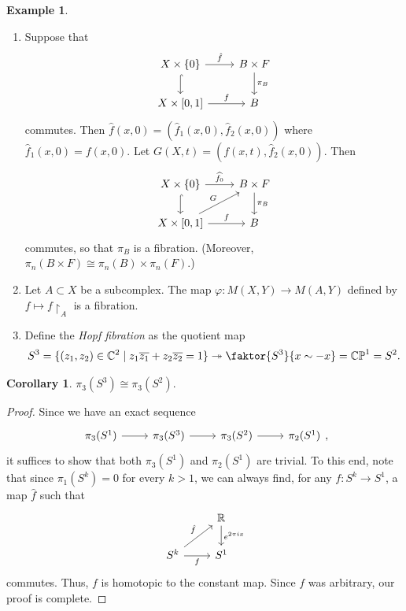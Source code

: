 \documentclass[10pt,letterpaper,cm]{nupset}
\theoremstyle{definition}
\newtheorem{exmp}[defn]{Example}
\theoremstyle{theorem}
\newtheorem{corollary}[defn]{Corollary}
\theoremstyle{remark}
\newcommand{\C}{\mathbb C}
\newcommand{\CP}{\mathbb{CP}}
\newcommand{\R}{\mathbb{R}}
\newcommand{\1}{\mathbb{1}}
\newcommand{\0}{\vec 0}
\newcommand{\be}{\begin{enumerate}}
\newcommand{\ee}{\end{enumerate}}
\begin{document}
\begin{exmp} $ $
\be
\item Suppose that
\[
\begin{tikzcd}
X\times \{0\} \arrow[d, hook] \arrow[r, "\hat{f}"] & B \times F \arrow[d, "\pi_B"] \\
{X\times [0,1]} \arrow[r, "f"]                           & B                            
\end{tikzcd}
\] commutes. Then $\hat{f}(x,0) = \left(\hat{f}_1(x,0), \hat{f}_2(x,0)\right)$ where $\hat{f}_1(x,0) = f(x,0)$. Let $G(X,t) =  (f(x,t), \hat{f}_2(x,0))$. Then \[
\begin{tikzcd}
X\times \{0\} \arrow[d, hook] \arrow[r, "\widehat{f_0}"] & B \times F \arrow[d, "\pi_B"] \\
{X\times [0,1]} \arrow[r, "f"] \arrow[ru, "G"]           & B                            
\end{tikzcd}
\] commutes, so that $\pi_B$ is a fibration. (Moreover, $\pi_n(B \times F) \cong \pi_n(B) \times \pi_n(F)$.)
\item Let $A \subset X$ be a subcomplex. The map $\varphi : M(X, Y) \to M(A, Y)$ defined by $f \mapsto f\restriction_A$ is a fibration. 
\item Define the \textit{Hopf fibration} as the quotient map
\[
S^3 = \{(z_1, z_2) \in \C^2 \mid z_1\overline{z_1} + z_2\overline{z_2} =1\} \twoheadrightarrow \faktor{S^3}{x \sim {-}x} = \CP^1 =S^2.
\]
\ee
\end{exmp}

\begin{corollary}
$\pi_3(S^3) \cong \pi_3(S^2)$.
\end{corollary}
\begin{proof}
Since we have an exact sequence 
\[
\begin{tikzcd}
\pi_3(S^1) \arrow[r] & \pi_3(S^3) \arrow[r] & \pi_3(S^2) \arrow[r] & \pi_2(S^1)
\end{tikzcd},
\] it suffices to show that both $\pi_3(S^1)$ and $\pi_2(S^1)$ are trivial. To this end, note that since $\pi_1(S^k) =0$ for every $k>1$, we can always find,  for any $f: S^k \to S^1$,  a map $\hat{f}$ such that
\[
\begin{tikzcd}
                                                  & \R \arrow[d, "e^{2\pi i x}"] \\
S^k \arrow[r, "f"'] \arrow[ru, "\hat{f}"] & S^1                         
\end{tikzcd}
\] commutes. Thus, $f$ is homotopic to the constant map. Since $f$ was arbitrary, our proof is complete.
\end{proof}
\end{document}
